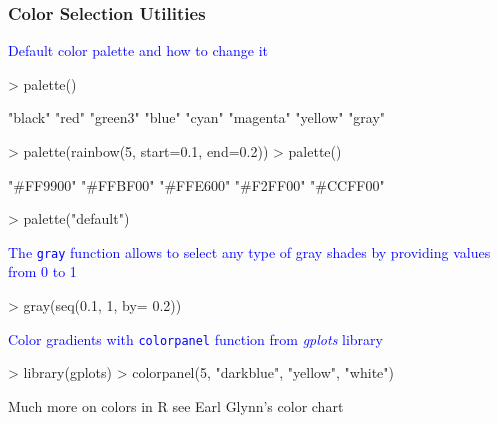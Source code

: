 \documentclass{beamer}
\newcommand{\Rfunction}[1]{{\texttt{#1}}}
\newcommand{\Rpackage}[1]{{\textit{#1}}}
\begin{document}
\begin{frame}[containsverbatim]  
	\frametitle{Color Selection Utilities}
\scriptsize
\textcolor{blue}{Default color palette and how to change it}
\begin{Schunk}
\begin{Sinput}
> palette()
\end{Sinput}
\begin{Soutput}
[1] "black"   "red"     "green3"  "blue"    "cyan"    "magenta" "yellow"  "gray"   
\end{Soutput}
\begin{Sinput}
> palette(rainbow(5, start=0.1, end=0.2))
> palette()
\end{Sinput}
\begin{Soutput}
[1] "#FF9900" "#FFBF00" "#FFE600" "#F2FF00" "#CCFF00"
\end{Soutput}
\begin{Sinput}
> palette("default")
\end{Sinput}
\end{Schunk}
\textcolor{blue}{The \Rfunction{gray} function allows to select any type of gray shades by providing values from 0 to 1}
\begin{Schunk}
\begin{Sinput}
> gray(seq(0.1, 1, by= 0.2))
\end{Sinput}
\end{Schunk}
\textcolor{blue}{Color gradients with \Rfunction{colorpanel} function from \Rpackage{gplots} library}
\begin{Schunk}
\begin{Sinput}
> library(gplots)
> colorpanel(5, "darkblue", "yellow", "white")
\end{Sinput}
\end{Schunk}
Much more on colors in R see Earl Glynn's color chart \href{http://research.stowers-institute.org/efg/R/Color/Chart/}{{}} 
\end{frame}
\end{document}
